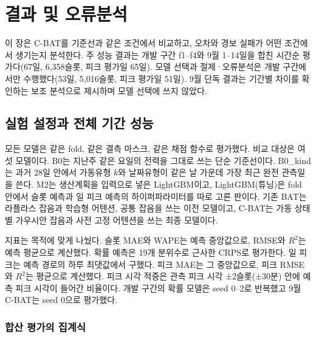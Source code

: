 \section{결과 및 오류분석}

이 장은 C-BAT를 기준선과 같은 조건에서 비교하고, 오차와 경보 실패가 어떤 조건에서 생기는지 분석한다. 주 성능 결과는 개발 구간 f1--f4와 9월 1--14일을 합친 시간순 평가다(67일, 6,358슬롯, 피크 평가일 65일). 모델 선택과 절제·오류분석은 개발 구간에서만 수행했다(53일, 5,016슬롯, 피크 평가일 51일). 9월 단독 결과는 기간별 차이를 확인하는 보조 분석으로 제시하며 모델 선택에 쓰지 않았다.

\subsection{실험 설정과 전체 기간 성능}

모든 모델은 같은 fold, 같은 결측 마스크, 같은 채점 함수로 평가했다. 비교 대상은 여섯 모델이다. B0는 지난주 같은 요일의 전력을 그대로 쓰는 단순 기준선이다. B0\_kind는 과거 28일 안에서 가동유형 $k$와 날짜유형이 같은 날 가운데 가장 최근 완전 관측일을 쓴다. M2는 생산계획을 입력으로 넣은 LightGBM\citep{ke2017lightgbm}이고, LightGBM(튜닝)은 fold 안에서 슬롯 예측과 일 피크 예측의 하이퍼파라미터를 따로 고른 판이다. 기존 BAT는 라플라스 잡음과 학습형 어텐션, 공통 잡음을 쓰는 이전 모델이고, C-BAT는 가동 상태별 가우시안 잡음과 사전 고정 어텐션을 쓰는 최종 모델이다.

지표는 목적에 맞게 나눴다. 슬롯 MAE와 WAPE는 예측 중앙값으로, RMSE와 $R^2$는 예측 평균으로 계산했다. 확률 예측은 19개 분위수로 근사한 CRPS\citep{gneiting2007scoring}로 평가한다. 일 피크는 예측 경로의 하루 최댓값에서 구했다. 피크 MAE는 그 중앙값으로, 피크 RMSE와 $R^2$는 평균으로 계산했다. 피크 시각 적중은 관측 피크 시각 ±2슬롯(±30분) 안에 예측 피크 시각이 들어간 비율이다. 개발 구간의 확률 모델은 seed 0--2로 반복했고 9월 C-BAT는 seed 0으로 평가했다.

\subsubsection{합산 평가의 집계식}

